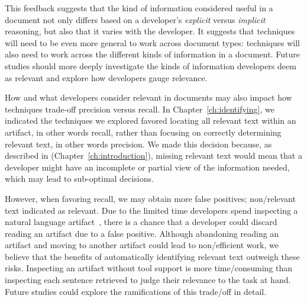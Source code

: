 \smallskip
This feedback suggests that the kind of information considered useful in a document not only differs based on 
a developer's  \textit{explicit} versus \textit{implicit} reasoning, but also that it varies with the developer. 
It suggests that techniques will need to
be even more general to work across document
types: techniques will also need to work across
the different kinds of information in a document.
Future studies should more deeply investigate
the kinds of information developers deem as
relevant and explore how developers gauge relevance.





How and what developers consider relevant in
documents may also impact how techniques trade-off
precision versus recall. 
In Chapter~\ref{ch:identifying}, we indicated
the techniques we explored favored locating
all relevant text within an
artifact, in other words recall, rather
than focusing on 
correctly determining relevant text, in other
words precision. 
We made this decision because, as described in 
 (Chapter~\ref{ch:introduction}),
missing relevant text would mean that a developer might have an incomplete or partial view of the information needed, which may lead to
sub-optimal decisions.





However, when favoring recall,  we may obtain more false positives; non\-/relevant text indicated as relevant.
Due to the limited time developers spend inspecting a natural language artifact~\cite{Starke2009}, there is a chance that
 a developer could discard reading an artifact due to a false positive. 
 Although abandoning reading an artifact and moving to another artifact could lead to non\-/efficient work,
we believe that the benefits of automatically identifying relevant text outweigh these risks. 
Inspecting an artifact without tool support is more time\-/consuming
than inspecting each sentence retrieved to judge their relevance to the task at hand. 
Future studies could explore the ramifications
of this trade\-/off in detail.









